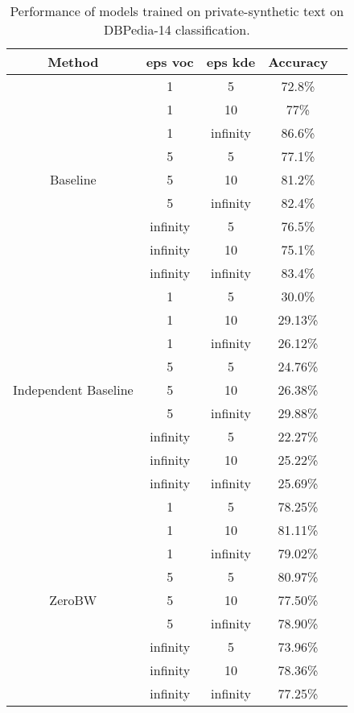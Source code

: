 \small{
\begin{table}
{
\begin{centering}
\begin{tabular}{c c c c c}
\toprule
Method &  eps voc & eps kde & Accuracy \\
\midrule
\rule{0pt}{3ex}
{} &   1 & 5 & 72.8\% \\
{}  & 1 & 10 & 77\% \\
{} &  1 & infinity & 86.6\% \\
\cline{2-4}
\rule{0pt}{3ex}
{} &  5 & 5 & 77.1\% \\
Baseline  & 5 & 10 & 81.2\% \\
{} &  5 & infinity & 82.4\% \\
\cline{2-4}
\rule{0pt}{3ex}
{} &  infinity & 5 & 76.5\% \\
  & infinity & 10 & 75.1\% \\
{} & infinity & infinity & 83.4\% \\
\midrule
\rule{0pt}{3ex}
{} &   1 & 5 & 30.0\% \\
{}  & 1 & 10 &  29.13\%\\
{} &  1 & infinity & 26.12\% \\
\cline{2-4}
\rule{0pt}{3ex}
{} &  5 & 5 &  24.76\%\\
Independent Baseline  & 5 & 10 &  26.38\%\\
{} &  5 & infinity & 29.88\% \\
\cline{2-4}
\rule{0pt}{3ex}
{} &  infinity & 5 & 22.27\% \\
  & infinity & 10 &  25.22\%\\
{} & infinity & infinity & 25.69\% \\
\midrule
\rule{0pt}{3ex}
{} &   1 & 5 & 78.25\% \\
{}  & 1 & 10 & 81.11\% \\
{} &  1 & infinity & 79.02\% \\
\cline{2-4}
\rule{0pt}{3ex}
{} &  5 & 5 & 80.97\% \\
ZeroBW  & 5 & 10 & 77.50\% \\
{} &  5 & infinity & 78.90\% \\
\cline{2-4}
\rule{0pt}{3ex}
{} &  infinity & 5 & 73.96\% \\
  & infinity & 10 & 78.36\% \\
{} & infinity & infinity & 77.25\% \\
\bottomrule
\end{tabular}
\caption{Performance of models trained on private-synthetic text on DBPedia-14 classification.} \label{tbl:datasets}
\end{centering}}
\end{table}
}


